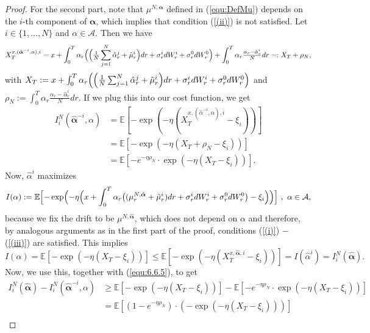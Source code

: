 \documentclass[10pt,a4paper]{article}
\newcommand{\Balpha}{\boldsymbol{\alpha}}
\newcommand{\hBalpha}{\hat{\Balpha}}
\theoremstyle{plain}
\theoremstyle{definition}
\numberwithin{equation}{section}
\begin{document}
\begin{proof}
For the second part, note that $\mu^{N,\Balpha}$ defined in (\ref{equ:DefMu}) depends on the $i$-th component of $\Balpha$, which implies that condition (\ref{(ii)}) is not satisfied. Let $i \in \{1,...,N\}$ and $\alpha \in \mathcal{A}$. Then we have
\[
X_{T}^{x,(\hBalpha^{-i},\alpha),i} = x + \int_{0}^{T}\alpha_{r}\Bigl(\Bigl(\tfrac{1}{N}\sum_{j=1}^{N}\hat{\alpha}_{r}^{j} + \tilde{\mu}_{r}^{i}\Bigr)dr + \sigma_{r}^{i}dW_{r}^{i} + \sigma_{r}^{0}dW_{r}^{0}\Bigr) + \int_{0}^{T}\alpha_{r}\tfrac{\alpha_{r}-\hat{\alpha}_{r}^{i}}{N}dr =: X_{T} + \rho_{N},
\]
with
$
X_{T} := x + \int_{0}^{T}\alpha_{r}\Bigl(\Bigl(\tfrac{1}{N}\sum_{j=1}^{N}\hat{\alpha}_{r}^{j} + \tilde{\mu}_{r}^{i}\Bigr)dr + \sigma_{r}^{i}dW_{r}^{i} + \sigma_{r}^{0}dW_{r}^{0}\Bigr)
$
and $\rho_{N} := \int_{0}^{T}\alpha_{r}\tfrac{\alpha_{r}-\hat{\alpha}_{r}^{i}}{N}dr$. If we plug this into our cost function, we get
\begin{align}
I_{i}^{N}(\hBalpha^{-i},\alpha) &= \mathbb{E}[-\exp(-\eta(X_{T}^{x,(\hat{\alpha}^{-i},\alpha),i}-\xi_{i}))] \nonumber \\
&= \mathbb{E}[-\exp(-\eta(X_{T} + \rho_{N}-\xi_{i}))] \nonumber \\ 
&= \mathbb{E}[-e^{-\eta\rho_{N}} \cdot \exp(-\eta(X_{T}-\xi_{i}))]. \label{equ:6.6.5}
\end{align}
Now, $\hat{\alpha}^{i}$ maximizes
\begin{equation}
\label{equ:6.max}
I(\alpha) := \mathbb{E}\Bigl[-\exp\Bigl(-\eta\Bigl(x + \int_{0}^{T}\alpha_{r}\bigl((\mu_{r}^{N,\hBalpha}+\tilde{\mu}_{r}^{i})dr + \sigma_{r}^{i}dW_{r}^{i} + \sigma_{r}^{0}dW_{r}^{0}\bigr) - \xi_i\Bigr)\Bigr)\Bigr] \ , \ \alpha \in \mathcal{A},
\end{equation}
because we fix the drift to be $\mu^{N,\hBalpha}$, which does not depend on $\alpha$ and therefore, by analogous arguments as in the first part of the proof, conditions (\ref{(i)}) $-$ (\ref{(iii)}) are satisfied. This implies
\[
I(\alpha) = \mathbb{E}[-\exp(-\eta(X_{T}-\xi_{i}))] \leq \mathbb{E}[-\exp(-\eta(X_{T}^{x,\hBalpha,i}-\xi_{i}))] = I(\hat{\alpha}^{i}) = I_{i}^{N}(\hBalpha).
\]
Now, we use this, together with (\ref{equ:6.6.5}), to get
\begin{align}
I_{i}^{N}(\hBalpha) - I_{i}^{N}(\hBalpha^{-i},\alpha) &\geq \mathbb{E}[-\exp(-\eta(X_{T}-\xi_{i}))] - \mathbb{E}[-e^{-\eta\rho_{N}} \cdot \exp(-\eta(X_{T}-\xi_{i}))] \nonumber \\
&= \mathbb{E}[(1-e^{-\eta\rho_{N}}) \cdot (-\exp(-\eta(X_{T}-\xi_{i})))] \nonumber \\

\end{align}
\end{proof}
\end{document}
